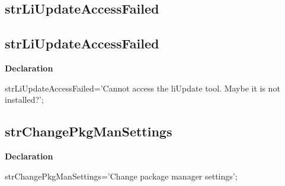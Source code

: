 \documentclass{report}
\newif\ifpdf
\begin{document}
\subsection*{\large{\textbf{strLiUpdateAccessFailed}}\normalsize\hspace{1ex}\hrulefill}
\else
\subsection*{strLiUpdateAccessFailed}
\fi
\label{trstrings-strLiUpdateAccessFailed}
\begin{list}{}{
\setlength{\itemindent}{0cm}
\setlength{\listparindent}{0cm}
\setlength{\leftmargin}{\evensidemargin}
\addtolength{\leftmargin}{\tmplength}
\settowidth{\labelsep}{X}
\addtolength{\leftmargin}{\labelsep}
\setlength{\labelwidth}{\tmplength}
}
\item[\textbf{Declaration}\hfill]
\ifpdf
\begin{flushleft}
\fi
\begin{ttfamily}
strLiUpdateAccessFailed='Cannot access the liUpdate tool. Maybe it is not installed?';\end{ttfamily}

\ifpdf
\end{flushleft}
\fi

\end{list}
\ifpdf
\subsection*{\large{\textbf{strChangePkgManSettings}}\normalsize\hspace{1ex}\hrulefill}
\else
\subsection*{strChangePkgManSettings}
\fi
\label{trstrings-strChangePkgManSettings}
\begin{list}{}{
\setlength{\itemindent}{0cm}
\setlength{\listparindent}{0cm}
\setlength{\leftmargin}{\evensidemargin}
\addtolength{\leftmargin}{\tmplength}
\settowidth{\labelsep}{X}
\addtolength{\leftmargin}{\labelsep}
\setlength{\labelwidth}{\tmplength}
}
\item[\textbf{Declaration}\hfill]
\ifpdf
\begin{flushleft}
\fi
\begin{ttfamily}
strChangePkgManSettings='Change package manager settings';\end{ttfamily}

\ifpdf
\end{flushleft}
\fi

\end{list}
\ifpdf
\end{document}
